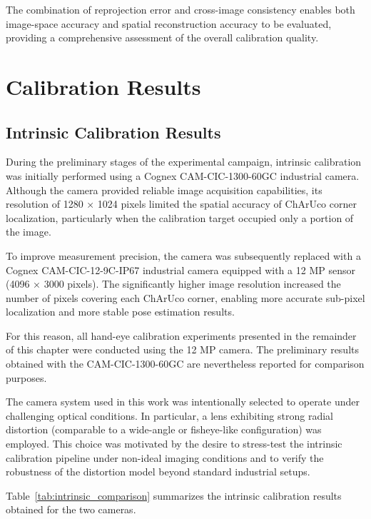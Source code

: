 The combination of reprojection error and cross-image consistency enables both image-space accuracy and spatial reconstruction accuracy to be evaluated, providing a comprehensive assessment of the overall calibration quality.



\section{Calibration Results}



\subsection{Intrinsic Calibration Results}
\label{subsec:intrinsic_results}

During the preliminary stages of the experimental campaign, intrinsic calibration was initially performed using a Cognex CAM-CIC-1300-60GC industrial camera. Although the camera provided reliable image acquisition capabilities, its resolution of 1280 × 1024 pixels limited the spatial accuracy of ChArUco corner localization, particularly when the calibration target occupied only a portion of the image.

To improve measurement precision, the camera was subsequently replaced with a Cognex CAM-CIC-12-9C-IP67 industrial camera equipped with a 12 MP sensor (4096 × 3000 pixels). The significantly higher image resolution increased the number of pixels covering each ChArUco corner, enabling more accurate sub-pixel localization and more stable pose estimation results.

For this reason, all hand-eye calibration experiments presented in the remainder of this chapter were conducted using the 12 MP camera. The preliminary results obtained with the CAM-CIC-1300-60GC are nevertheless reported for comparison purposes.

The camera system used in this work was intentionally selected to operate under challenging optical conditions. In particular, a lens exhibiting strong radial distortion (comparable to a wide-angle or fisheye-like configuration) was employed. This choice was motivated by the desire to stress-test the intrinsic calibration pipeline under non-ideal imaging conditions and to verify the robustness of the distortion model beyond standard industrial setups.

Table~\ref{tab:intrinsic_comparison} summarizes the intrinsic calibration results obtained for the two cameras.

